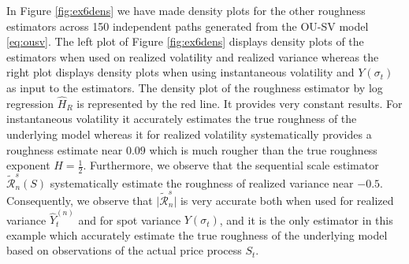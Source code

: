 \documentclass{article}
\begin{document}
In Figure \ref{fig:ex6dens} we have made density plots for the other roughness estimators across 150 independent paths generated from the OU-SV model \eqref{eq:ousv}. The left plot of Figure \ref{fig:ex6dens} displays density plots of the estimators when used on realized volatility and realized variance whereas the right plot displays density plots when using instantaneous volatility and $Y(\sigma_t)$ as input to the estimators. The density plot of the roughness estimator by log regression $\widehat{H}_R$ is represented by the red line. It provides very constant results. For instantaneous volatility it accurately estimates the true roughness of the underlying model whereas it for realized volatility systematically provides a roughness estimate near $0.09$ which is much rougher than the true roughness exponent $H=\frac{1}{2}$. Furthermore, we observe that the sequential scale estimator $\widetilde{\mathscr{R}}_n^s(S)$ systematically estimate the roughness of realized variance near $-0.5$. Consequently, we observe that $\lvert \widetilde{\mathscr{R}}_n^s\rvert$ is very accurate both when used for realized variance $\hat{Y}_t^{(n)}$ and for spot variance $Y(\sigma_t)$, and it is the only estimator in this example which accurately estimate the true roughness of the underlying model based on observations of the actual price process $S_t$.
\end{document}
